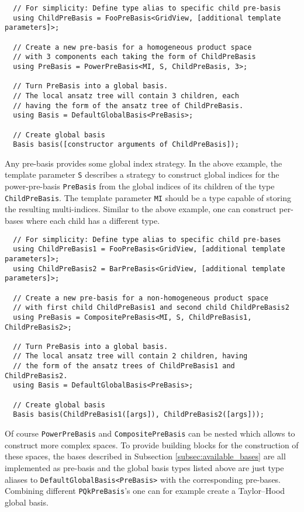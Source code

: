 \documentclass[a4paper,10pt,headings=normal,bibliography=totoc]{scrartcl}
\newcommand{\cpp}[1]{\lstinline[basicstyle=\ttfamily]!#1!}
\begin{document}
\begin{lstlisting}
  // For simplicity: Define type alias to specific child pre-basis
  using ChildPreBasis = FooPreBasis<GridView, [additional template parameters]>;

  // Create a new pre-basis for a homogeneous product space
  // with 3 components each taking the form of ChildPreBasis
  using PreBasis = PowerPreBasis<MI, S, ChildPreBasis, 3>;

  // Turn PreBasis into a global basis.
  // The local ansatz tree will contain 3 children, each
  // having the form of the ansatz tree of ChildPreBasis.
  using Basis = DefaultGlobalBasis<PreBasis>;

  // Create global basis
  Basis basis([constructor arguments of ChildPreBasis]);
\end{lstlisting}

Any pre-basis provides some global index strategy. In the
above example, the template parameter \cpp{S} describes
a strategy to construct global indices for the power-pre-basis
\cpp{PreBasis} from the global indices of its children
of the type \cpp{ChildPreBasis}. The template parameter
\cpp{MI} should be a type capable of storing the resulting
multi-indices. Similar to the above example, one can construct
per-bases where each child has a different type.

\begin{lstlisting}
  // For simplicity: Define type alias to specific child pre-bases
  using ChildPreBasis1 = FooPreBasis<GridView, [additional template parameters]>;
  using ChildPreBasis2 = BarPreBasis<GridView, [additional template parameters]>;

  // Create a new pre-basis for a non-homogeneous product space
  // with first child ChildPreBasis1 and second child ChildPreBasis2
  using PreBasis = CompositePreBasis<MI, S, ChildPreBasis1, ChildPreBasis2>;

  // Turn PreBasis into a global basis.
  // The local ansatz tree will contain 2 children, having
  // the form of the ansatz trees of ChildPreBasis1 and ChildPreBasis2.
  using Basis = DefaultGlobalBasis<PreBasis>;

  // Create global basis
  Basis basis(ChildPreBasis1([args]), ChildPreBasis2([args]));
\end{lstlisting}

Of course \cpp{PowerPreBasis} and \cpp{CompositePreBasis}
can be nested which allows to construct more complex spaces.
To provide building blocks for the construction of these spaces, the bases
described in Subsection \ref{subsec:available_bases} are
all implemented as pre-basis and the global basis types
listed above are just type aliases to \cpp{DefaultGlobalBasis<PreBasis>}
with the corresponding pre-bases.
Combining different \cpp{PQkPreBasis}'s one can for
example create a Taylor--Hood global basis.
\end{document}
